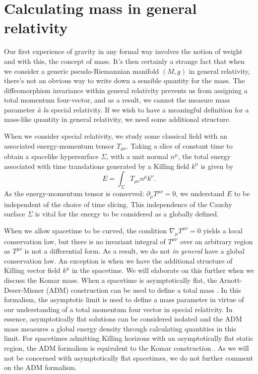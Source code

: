 \section{Calculating mass in general relativity}
\label{sec:gravitationalmass}
Our first experience of gravity in any formal way involves the notion of weight and with this, the concept of mass. It's then certainly a strange fact that when we consider a generic pseudo-Riemannian manifold $(M,g)$ in general relativity, there's not an obvious way to write down a sensible quantity for the mass. The diffeomorphism invariance within general relativity prevents us from assigning a total momentum four-vector, and as a result, we cannot the measure mass parameter \emph{\`a la} special relativity. If we wish to have a meaningful definition for a mass-like quantity in general relativity, we need some additional structure.

When we consider special relativity, we study some classical field with an associated energy-momentum tensor $T_{\mu \nu}$. Taking a slice of constant time to obtain a spacelike hypersurface $\Sigma$, with a unit normal $n^\mu$, the total energy associated with time translations generated by a Killing field $k^\mu$ is given by
	\begin{equation*}
		E = \int_{\Sigma} T_{\mu \nu} n^\mu k^\nu.
	\end{equation*}
As the energy-momentum tensor is conserved: $\partial_\mu T^{\mu \nu} = 0$, we understand $E$ to be independent of the choice of time slicing. This independence of the Cauchy surface $\Sigma$ is vital for the energy to be considered as a globally defined.
	
When we allow spacetime to be curved, the condition $\nabla_\mu T^{\mu \nu} = 0$ yields a local conservation law, but there is no invariant integral of $T^{\mu \nu}$ over an arbitrary region as $T^{\mu \nu}$ is not a differential form. As a result, we do not \emph{in general} have a global conservation law. An exception is when we have the additional structure of Killing vector field $k^\mu$ in the spacetime. We will elaborate on this further when we discuss the Komar mass. When a spacetime is asymptotically flat, the Arnott-Deser-Misner (ADM) construction can be used to define a total mass \cite{arnowitt1959}. In this formalism, the asymptotic limit is used to define a mass parameter in virtue of our understanding of a total momentum four vector in special relativity. In essence, asymptotically flat solutions can be considered isolated and the ADM mass measures a global energy density through calculating quantities in this limit. For spacetimes admitting Killing horizons with an asymptotically flat static region, the ADM formalism is equivalent to the Komar construction \cite{Ashtekar:1979cc}. As we will not be concerned with asymptotically flat spacetimes, we do not further comment on the ADM formalism.

